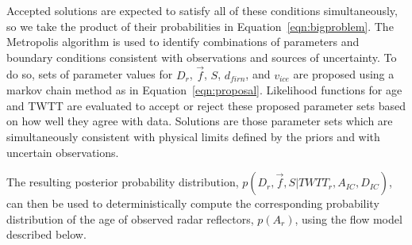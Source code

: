 Accepted solutions are expected to satisfy all of these conditions simultaneously, so we take the product of their probabilities in Equation~\ref{eqn:bigproblem}. The Metropolis algorithm is used to identify combinations of parameters and boundary conditions consistent with observations and sources of uncertainty. To do so, sets of parameter values for $D_r$, $\vec{f}$, $S$, $d_{firn}$, and $v_{ice}$ are proposed using a markov chain method as in Equation~\ref{eqn:proposal}. %
Likelihood functions for age and TWTT are evaluated to accept or reject these proposed parameter sets based on how well they agree with data. Solutions are those parameter sets which are simultaneously consistent with physical limits defined by the priors and with uncertain observations. 

The resulting posterior probability distribution, $p(D_r, \vec{f},S | TWTT_r, A_{IC}, D_{IC})$, can then be used to deterministically compute the corresponding probability distribution of the age of observed radar reflectors, $p(A_r)$, using the flow model described below.



\label{radardepth}

%



